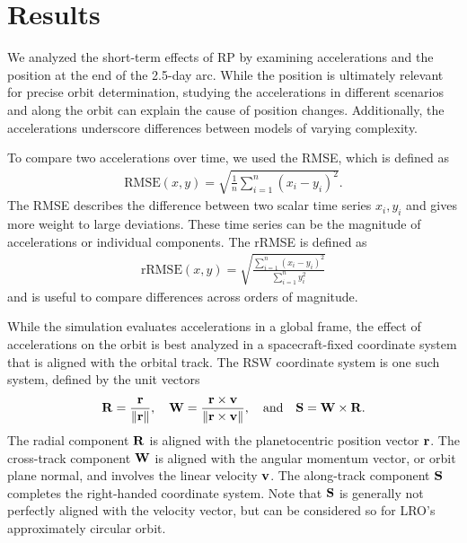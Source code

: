 \section{Results}

We analyzed the short-term effects of \gls{RP} by examining accelerations and the position at the end of the 2.5-day arc. While the position is ultimately relevant for precise orbit determination, studying the accelerations in different scenarios and along the orbit can explain the cause of position changes. Additionally, the accelerations underscore differences between models of varying complexity.

To compare two accelerations over time, we used the \gls{RMSE}, which is defined as
\begin{align}
    \text{RMSE}(x, y) = \sqrt{\frac{1}{n}\sum_{i=1}^{n}\left(x_i - y_i\right)^2}.
\end{align}
The \gls{RMSE} describes the difference between two scalar time series $x_i, y_i$ and gives more weight to large deviations. These time series can be the magnitude of accelerations or individual components. The \gls{rRMSE} is defined as
\begin{align}
    \text{rRMSE}(x, y) = \sqrt{\frac{\sum_{i=1}^{n}\left(x_i - y_i\right)^2}{\sum_{i=1}^{n} y_i^2}}
\end{align}
and is useful to compare differences across orders of magnitude.

While the simulation evaluates accelerations in a global frame, the effect of accelerations on the orbit is best analyzed in a spacecraft-fixed coordinate system that is aligned with the orbital track. The RSW coordinate system is one such system, defined by the unit vectors~\cite{Vallado2013}
\begin{align}
    \vb R = \frac{\vb r}{\norm{\vb r}}, \quad
    \vb W = \frac{\vb r \times \vb v}{\norm{\vb r \times \vb v}},
    \quad \textrm{and} \quad \vb S = \vb W \times \vb R.
\end{align}
The radial component $\vb R$ is aligned with the planetocentric position vector $\vb r$. The cross-track component $\vb W$ is aligned with the angular momentum vector, or orbit plane normal, and involves the linear velocity $\vb v$. The along-track component $\vb S$ completes the right-handed coordinate system. Note that $\vb S$ is generally not perfectly aligned with the velocity vector, but can be considered so for \gls{LRO}'s approximately circular orbit.





